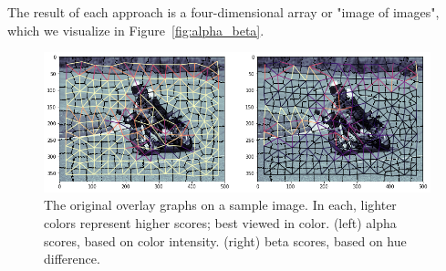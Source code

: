 \documentclass[twocolumn]{article}
\newcommand{\figref}[1]{Figure~\ref{fig:#1}}
\newcommand{\figlab}[1]{\label{fig:#1}}
\begin{document}
The result of each approach is a four-dimensional array or "image of
images", which we visualize in \figref{alpha_beta}.

\begin{figure}
  \centering
  \includegraphics[width=\linewidth]{figs/ab_graphs.png}

  \caption{
    The original overlay graphs on a sample image. In each, lighter colors represent higher scores; best viewed in color.
    (left) alpha scores, based on color intensity. (right) beta scores, based on hue difference.
  }
  \figlab{ab_graph}

\end{figure}
\end{document}
